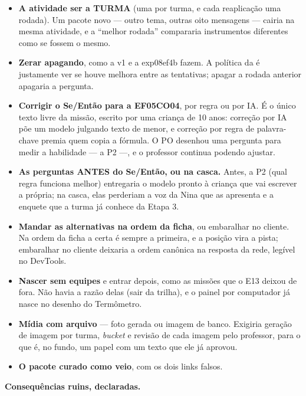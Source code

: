 \begin{itemize}
  \item \textbf{A atividade ser a TURMA} (uma por turma, e cada reaplicação uma
    rodada). Um pacote novo --- outro tema, outras oito mensagens --- cairia na
    mesma atividade, e a \enquote{melhor rodada} compararia instrumentos
    diferentes como se fossem o mesmo.
  \item \textbf{Zerar apagando}, como a v1 e a exp08ef4b fazem. A política da
     é justamente ver se houve melhora entre as tentativas;
    apagar a rodada anterior apagaria a pergunta.
  \item \textbf{Corrigir o Se/Então para a EF05CO04}, por regra ou por IA. É o
    único texto livre da missão, escrito por uma criança de 10 anos: correção
    por IA põe um modelo julgando texto de menor, e correção por regra de
    palavra-chave premia quem copia a fórmula. O PO desenhou uma pergunta para
    medir a habilidade --- a P2 ---, e o professor continua podendo ajustar.
  \item \textbf{As perguntas ANTES do Se/Então, ou na casca.} Antes, a P2 (qual
    regra funciona melhor) entregaria o modelo pronto à criança que vai
    escrever a própria; na casca, elas perderiam a voz da Nina que as
    apresenta e a enquete que a turma já conhece da Etapa 3.
  \item \textbf{Mandar as alternativas na ordem da ficha}, ou embaralhar no
    cliente. Na ordem da ficha a certa é sempre a primeira, e a posição vira a
    pista; embaralhar no cliente deixaria a ordem canônica na resposta da rede,
    legível no DevTools.
  \item \textbf{Nascer sem equipes} e entrar depois, como as missões que o E13
    deixou de fora. Não havia a razão delas (sair da trilha), e o painel por
    computador já nasce no desenho do Termômetro.
  \item \textbf{Mídia com arquivo} --- foto gerada ou imagem de banco. Exigiria
    geração de imagem por turma, \emph{bucket} e revisão de cada imagem pelo
    professor, para o que é, no fundo, um papel com um texto que ele já aprovou.
  \item \textbf{O pacote curado como veio}, com os dois links falsos.
\end{itemize}

\textbf{Consequências ruins, declaradas.}

